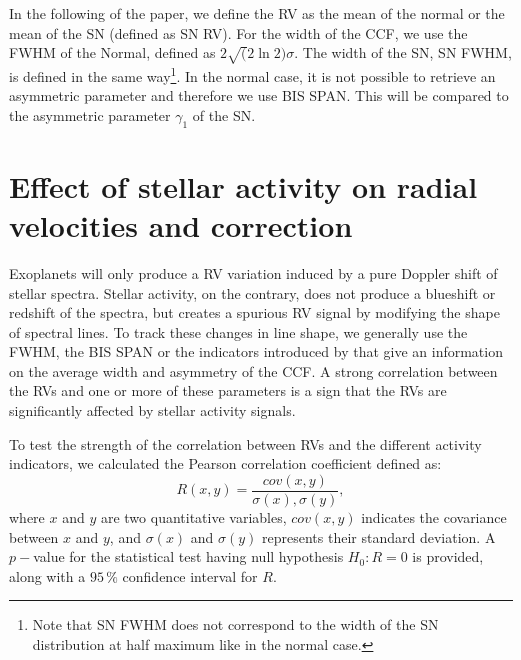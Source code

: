 \documentclass[11pt, oneside]{article}
\begin{document}
In the following of the paper, we define the RV as the mean of the normal or the mean of the SN (defined as SN RV). For the width of the CCF, we use the FWHM of the Normal, defined as $2\sqrt(2\ln2)\sigma$. The width of the SN, SN FWHM, is defined in the same way\footnote{Note that SN FWHM does not correspond to the width of the SN distribution at half maximum like in the normal case.}. In the normal case, it is not possible to retrieve an asymmetric parameter and therefore we use BIS SPAN. This will be compared to the asymmetric parameter $\gamma_1$ of the SN.







\section{Effect of stellar activity on radial velocities and correction} \label{sec:31}

Exoplanets will only produce a RV variation induced by a pure Doppler shift of stellar spectra. Stellar activity, on the contrary, does not produce a blueshift or redshift of the spectra, but creates a spurious RV signal by modifying the shape of spectral lines. To track these changes in line shape, we generally use the FWHM, the BIS SPAN or the indicators introduced by \citet{Figueira-2013} that give an information on the average width and asymmetry of the CCF. A strong correlation between the RVs and one or more of these parameters is a sign that the RVs are significantly affected by stellar activity signals.

To test the strength of the correlation between RVs and the different activity indicators, we calculated the Pearson correlation coefficient defined as:
%
\begin{equation}
R (x,y)= \frac{cov(x,y)}{\sigma(x),\sigma(y)},
\label{eq:Pearson:corr}
\end{equation}
where $x$ and $y$ are two quantitative variables, $cov(x,y)$ indicates the covariance between $x$ and $y$, and $\sigma(x)$ and $\sigma(y)$ represents their standard deviation. 
A $p-$value for the statistical test having null hypothesis $H_{0}: R=0$ is provided, along with a $95\,\%$ confidence interval for $R$.
%
\end{document}
